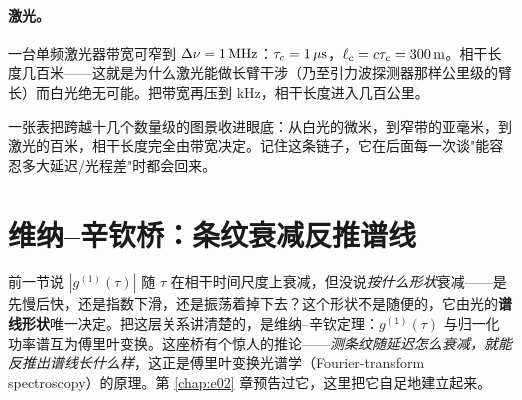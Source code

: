 \paragraph{激光。}一台单频激光器带宽可窄到 \(\Delta\nu=1\,{\rm MHz}\)：\(\tau_c=1\,\mu{\rm s}\)，\(\ell_c=c\tau_c=300\,{\rm m}\)。相干长度几百米——这就是为什么激光能做长臂干涉（乃至引力波探测器那样公里级的臂长）而白光绝无可能。把带宽再压到 kHz，相干长度进入几百公里。

一张表把跨越十几个数量级的图景收进眼底：从白光的微米，到窄带的亚毫米，到激光的百米，相干长度完全由带宽决定。记住这条链子，它在后面每一次谈"能容忍多大延迟/光程差"时都会回来。

\section{维纳--辛钦桥：条纹衰减反推谱线}
\label{sec:e09-wiener-khinchin}

前一节说 \(|g^{(1)}(\tau)|\) 随 \(\tau\) 在相干时间尺度上衰减，但没说\emph{按什么形状}衰减——是先慢后快，还是指数下滑，还是振荡着掉下去？这个形状不是随便的，它由光的\textbf{谱线形状}唯一决定。把这层关系讲清楚的，是维纳--辛钦定理：\(g^{(1)}(\tau)\) 与归一化功率谱互为傅里叶变换。这座桥有个惊人的推论——\emph{测条纹随延迟怎么衰减，就能反推出谱线长什么样}，这正是傅里叶变换光谱学（Fourier-transform spectroscopy）的原理。第 \ref{chap:e02} 章预告过它，这里把它自足地建立起来。

